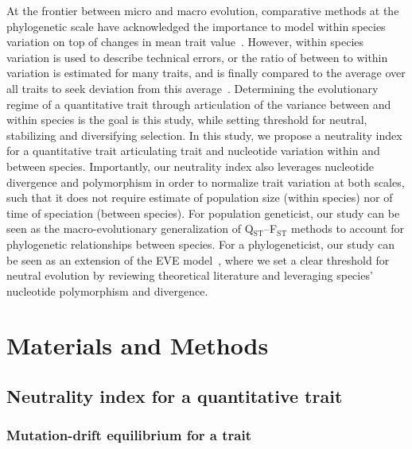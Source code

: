 \documentclass{article}
\begin{document}
At the frontier between micro and macro evolution, comparative methods at the phylogenetic scale have acknowledged the importance to model within species variation on top of changes in mean trait value~\cite{fay_evaluating_2008, kostikova_bridging_2016, gaboriau_multiplatform_2020}.
However, within species variation is used to describe technical errors, or the ratio of between to within variation is estimated for many traits, and is finally compared to the average over all traits to seek deviation from this average~\cite{rohlfs_modeling_2014, rohlfs_phylogenetic_2015}.
Determining the evolutionary regime of a quantitative trait through articulation of the variance between and within species is the goal is this study, while setting threshold for neutral, stabilizing and diversifying selection.
In this study, we propose a neutrality index for a quantitative trait articulating trait and nucleotide variation within and between species.
Importantly, our neutrality index also leverages nucleotide divergence and polymorphism in order to normalize trait variation at both scales, such that it does not require estimate of population size (within species) nor of time of speciation (between species).
For population geneticist, our study can be seen as the macro-evolutionary generalization of Q$_\text{ST}$--F$_\text{ST}$ methods to account for phylogenetic relationships between species.
For a phylogeneticist, our study can be seen as an extension of the EVE model~\cite{rohlfs_modeling_2014, rohlfs_phylogenetic_2015}, where we set a clear threshold for neutral evolution by reviewing theoretical literature and leveraging species' nucleotide polymorphism and divergence.

\section*{Materials and Methods}\label{sec:materials-and-methods}
\subsection*{Neutrality index for a quantitative trait}\label{subsec:neutrality-index-for-a-quantitative-trait}
\subsubsection*{Mutation-drift equilibrium for a trait}
\end{document}
